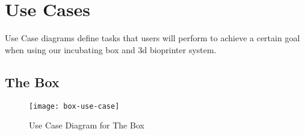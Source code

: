 \chapter{Use Cases}

Use Case diagrams deﬁne tasks that users will perform to achieve a certain goal when using our incubating box and 3d bioprinter system.

\section{The Box}

\begin{figure}[H]
\texttt{[image: box-use-case]}
\caption{\label{figure:box-use-case} Use Case Diagram for The Box}
\end{figure}

